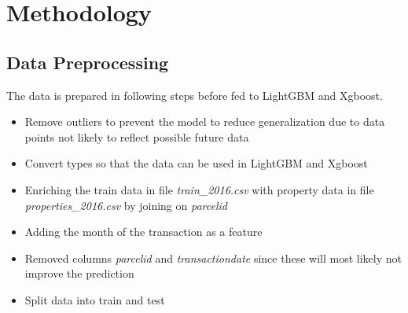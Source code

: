 \documentclass[a4paper]{article}
\begin{document}
\section{Methodology}

\subsection{Data Preprocessing}
The data is prepared in following steps before fed to LightGBM and Xgboost.
\begin{itemize}
    \item Remove outliers to prevent the model to reduce generalization due to data points not likely to
        reflect possible future data
    \item Convert types so that the data can be used in LightGBM and Xgboost
    \item Enriching the train data in file \textit{train\_2016.csv} with property data in file
        \textit{properties\_2016.csv} by joining on \textit{parcelid}
    \item Adding the month of the transaction as a feature
    \item Removed columns \textit{parcelid} and \textit{transactiondate} since these will most likely not
        improve the prediction
    \item Split data into train and test
\end{itemize}
\end{document}
